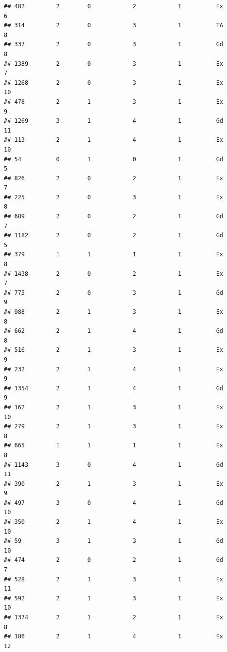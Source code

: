\documentclass[]{article}
\begin{document}
\begin{verbatim}
## 482         2        0            2            1          Ex            6
## 314         2        0            3            1          TA            8
## 337         2        0            3            1          Gd            8
## 1389        2        0            3            1          Ex            7
## 1268        2        0            3            1          Ex           10
## 478         2        1            3            1          Ex            9
## 1269        3        1            4            1          Gd           11
## 113         2        1            4            1          Ex           10
## 54          0        1            0            1          Gd            5
## 826         2        0            2            1          Ex            7
## 225         2        0            3            1          Ex            8
## 689         2        0            2            1          Gd            7
## 1182        2        0            2            1          Gd            5
## 379         1        1            1            1          Ex            8
## 1438        2        0            2            1          Ex            7
## 775         2        0            3            1          Gd            9
## 988         2        1            3            1          Ex            8
## 662         2        1            4            1          Gd            8
## 516         2        1            3            1          Ex            9
## 232         2        1            4            1          Ex            9
## 1354        2        1            4            1          Gd            9
## 162         2        1            3            1          Ex           10
## 279         2        1            3            1          Ex            8
## 665         1        1            1            1          Ex            8
## 1143        3        0            4            1          Gd           11
## 390         2        1            3            1          Ex            9
## 497         3        0            4            1          Gd           10
## 350         2        1            4            1          Ex           10
## 59          3        1            3            1          Gd           10
## 474         2        0            2            1          Gd            7
## 528         2        1            3            1          Ex           11
## 592         2        1            3            1          Ex           10
## 1374        2        1            2            1          Ex            8
## 186         2        1            4            1          Ex           12

\end{verbatim}
\end{document}
